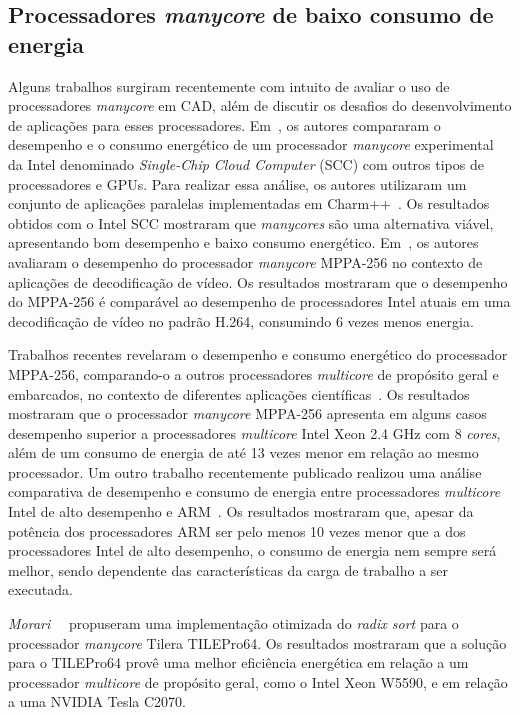 
\subsection{Processadores \textit{manycore} de baixo consumo de energia}
Alguns trabalhos surgiram recentemente com intuito de avaliar o uso de
processadores \emph{manycore} em CAD, além de discutir os desafios do
desenvolvimento de aplicações para esses processadores.
Em~\cite{SCCEnergy:2012}, os autores compararam o desempenho e o consumo
energético de um processador \emph{manycore} experimental da Intel denominado
\emph{Single-Chip Cloud Computer} (SCC) com outros tipos de processadores e
GPUs. Para realizar essa análise, os autores utilizaram um conjunto de
aplicações paralelas implementadas em Charm++~\cite{Charm:2012}. Os resultados
obtidos com o Intel SCC mostraram que \emph{manycores} são uma alternativa
viável, apresentando bom desempenho e baixo consumo energético.
Em~\cite{MPPA-1:2013}, os autores avaliaram o desempenho do processador
\emph{manycore} MPPA-256 no contexto de aplicações de decodificação de vídeo. Os
resultados mostraram que o desempenho do MPPA-256 é comparável ao desempenho de
processadores Intel atuais em uma decodificação de vídeo no padrão H.264,
consumindo 6 vezes menos energia.

Trabalhos recentes revelaram o desempenho e consumo energético do processador
MPPA-256, comparando-o a outros processadores \textit{multicore} de propósito
geral e embarcados, no contexto de diferentes aplicações
científicas~\cite{Castro-SBAC-PAD:2014,Castro-IA3:2013,Castro-IA3-JPDC:2014}. Os
resultados mostraram que o processador \emph{manycore} MPPA-256 apresenta em
alguns casos desempenho superior a processadores \emph{multicore} Intel Xeon 2.4
GHz com 8 \emph{cores}, além de um consumo de energia de até 13 vezes menor em
relação ao mesmo processador. Um outro trabalho recentemente publicado realizou
uma análise comparativa de desempenho e consumo de energia entre processadores
\emph{multicore} Intel de alto desempenho e ARM~\cite{Castro-Padoin-IET:2015}.
Os resultados mostraram que, apesar da potência dos processadores ARM ser pelo
menos 10 vezes menor que a dos processadores Intel de alto desempenho, o consumo
de energia nem sempre será melhor, sendo dependente das características da carga
de trabalho a ser executada.

\emph{Morari}~\etal~\cite{Valero:2012} propuseram uma implementação otimizada do
\textit{radix sort} para o processador \textit{manycore} Tilera TILEPro64. Os
resultados mostraram que a solução para o TILEPro64 provê uma melhor eficiência
energética em relação a um processador \textit{multicore} de propósito geral, como
o Intel Xeon W5590, e em relação a uma \gpu NVIDIA Tesla C2070.

